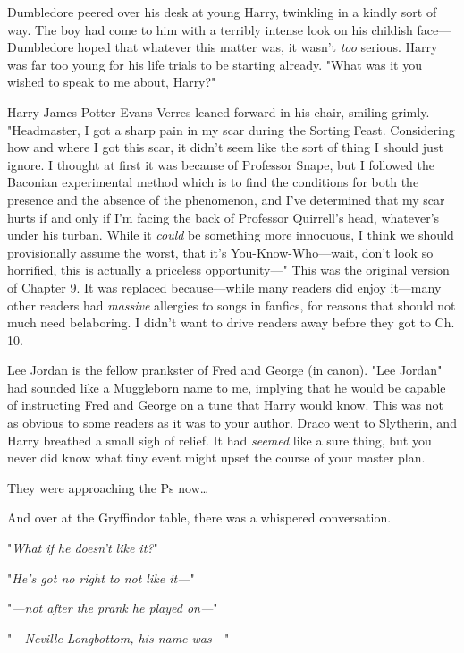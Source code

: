 
Dumbledore peered over his desk at young Harry, twinkling in a kindly sort of 
way. The boy had come to him with a terribly intense look on his childish 
face---Dumbledore hoped that whatever this matter was, it wasn't \emph{too} 
serious. Harry was far too young for his life trials to be starting already. 
"What was it you wished to speak to me about, Harry?"

Harry James Potter-Evans-Verres leaned forward in his chair, smiling grimly. 
"Headmaster, I got a sharp pain in my scar during the Sorting Feast. 
Considering how and where I got this scar, it didn't seem like the sort of 
thing I should just ignore. I thought at first it was because of Professor 
Snape, but I followed the Baconian experimental method which is to find the 
conditions for both the presence and the absence of the phenomenon, and I've 
determined that my scar hurts if and only if I'm facing the back of Professor 
Quirrell's head, whatever's under his turban. While it \emph{could} be 
something more innocuous, I think we should provisionally assume the worst, 
that it's You-Know-Who---wait, don't look so horrified, this is actually a 
priceless opportunity---"
\sbreak
This was the original version of Chapter 9. It was replaced because---while 
many readers did enjoy it---many other readers had \emph{massive} allergies to 
songs in fanfics, for reasons that should not much need belaboring. I didn't 
want to drive readers away before they got to Ch. 10.

Lee Jordan is the fellow prankster of Fred and George (in canon). "Lee Jordan" 
had sounded like a Muggleborn name to me, implying that he would be capable of 
instructing Fred and George on a tune that Harry would know. This was not as 
obvious to some readers as it was to your author.
\sbreak
Draco went to Slytherin, and Harry breathed a small sigh of relief. It had 
\emph{seemed} like a sure thing, but you never did know what tiny event might 
upset the course of your master plan.

They were approaching the Ps now{\ldots}

And over at the Gryffindor table, there was a whispered conversation.

"\emph{What if he doesn't like it?}"

"\emph{He's got no right to not like it---}"

"\emph{---not after the prank he played on---}"

"\emph{---Neville Longbottom, his name was---}"

